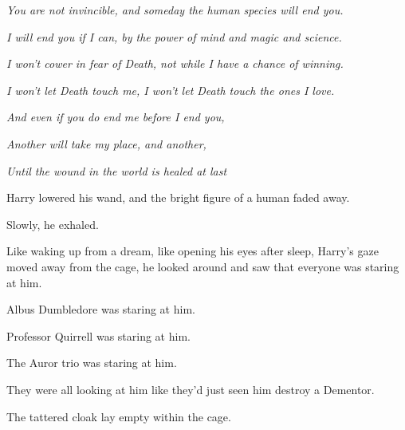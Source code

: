 \emph{You are not invincible, and someday the human species will end you.}

\emph{I will end you if I can, by the power of mind and magic and science.}

\emph{I won't cower in fear of Death, not while I have a chance of winning.}

\emph{I won't let Death touch me, I won't let Death touch the ones I love.}

\emph{And even if you do end me before I end you,}

\emph{Another will take my place, and another,}

\emph{Until the wound in the world is healed at last{\el}}

Harry lowered his wand, and the bright figure of a human faded away.

Slowly, he exhaled.

Like waking up from a dream, like opening his eyes after sleep, Harry's gaze
moved away from the cage, he looked around and saw that everyone was staring at
him.

Albus Dumbledore was staring at him.

Professor Quirrell was staring at him.

The Auror trio was staring at him.

They were all looking at him like they'd just seen him destroy a Dementor.

The tattered cloak lay empty within the cage.
